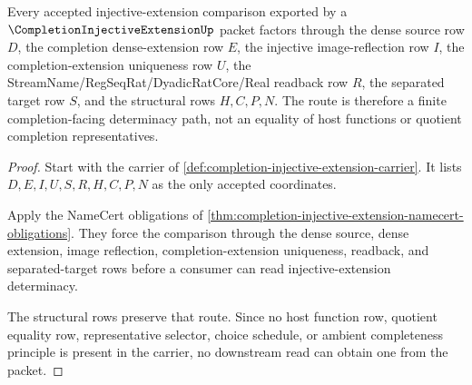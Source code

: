 \begin{theorem}
\label{thm:completion-injective-extension-uniqueness-route}
Every accepted injective-extension comparison exported by a $\CompletionInjectiveExtensionUp$ packet factors through the dense source row $D$, the completion dense-extension row $E$, the injective image-reflection row $I$, the completion-extension uniqueness row $U$, the StreamName/RegSeqRat/DyadicRatCore/Real readback row $R$, the separated target row $S$, and the structural rows $H,C,P,N$. The route is therefore a finite completion-facing determinacy path, not an equality of host functions or quotient completion representatives.
\end{theorem}
\begin{proof}
Start with the carrier of \autoref{def:completion-injective-extension-carrier}. It lists $D,E,I,U,S,R,H,C,P,N$ as the only accepted coordinates.

Apply the NameCert obligations of \autoref{thm:completion-injective-extension-namecert-obligations}. They force the comparison through the dense source, dense extension, image reflection, completion-extension uniqueness, readback, and separated-target rows before a consumer can read injective-extension determinacy.

The structural rows preserve that route. Since no host function row, quotient equality row, representative selector, choice schedule, or ambient completeness principle is present in the carrier, no downstream read can obtain one from the packet.
\end{proof}

\begin{closurestatus}{\CompletionInjectiveExtensionUp}
  \theoryclosure{\seedClosure}
  \formalstatus{\unformalizedV}
\end{closurestatus}
